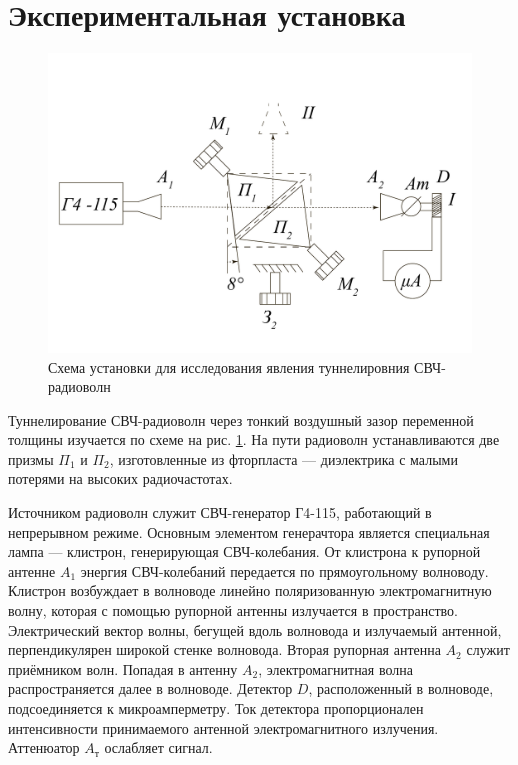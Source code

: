 \documentclass[a4paper, 12pt]{article}
\begin{document}
	\section{Экспериментальная установка}
	\begin{figure}[h]
		\centering
		\includegraphics[scale=0.4]{Facility.pdf}
		\caption{Схема установки для исследования явления туннелировния СВЧ-радиоволн}
		\label{fig:experimental}
	\end{figure}
	Туннелирование СВЧ-радиоволн через тонкий воздушный зазор переменной толщины изучается по схеме на рис. \ref{fig:experimental}. На пути радиоволн устанавливаются две призмы $\Pi_1$ и $\Pi_2$, изготовленные из фторпласта — диэлектрика с малыми потерями на высоких радиочастотах.\par
	Источником радиоволн служит СВЧ-генератор Г4-115, работающий в непрерывном режиме. Основным элементом генерачтора является специальная лампа — клистрон, генерирующая СВЧ-колебания. От клистрона к рупорной антенне $A_1$ энергия СВЧ-колебаний передается по прямоугольному волноводу. Клистрон возбуждает в волноводе линейно поляризованную электромагнитную волну, которая с помощью рупорной антенны излучается в пространство. Электрический вектор волны, бегущей вдоль волновода и излучаемый антенной, перпендикулярен широкой стенке волновода. Вторая рупорная антенна $A_2$ служит приёмником волн. Попадая в антенну $A_2$, электромагнитная волна распространяется далее в волноводе. Детектор $D$, расположенный в волноводе, подсоединяется к микроамперметру. Ток детектора пропорционален интенсивности принимаемого антенной электромагнитного излучения. Аттенюатор $A_\text{т}$ ослабляет сигнал.\par
\end{document}

